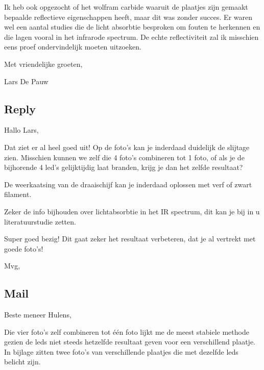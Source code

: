 \documentclass{article}
\begin{document}
 

Ik heb ook opgezocht of het wolfram carbide waaruit de plaatjes zijn gemaakt bepaalde reflectieve eigenschappen heeft, maar dit was zonder succes. Er waren wel een aantal studies die de licht absorbtie besproken om fouten te herkennen en die lagen vooral in het infrarode spectrum. De echte reflectiviteit zal ik misschien eens proef ondervindelijk moeten uitzoeken.

 

Met vriendelijke groeten,

 

Lars De Pauw



\subsection{Reply}

Hallo Lars,



Dat ziet er al heel goed uit!​ Op de foto's kan je inderdaad duidelijk de slijtage zien. Misschien kunnen we zelf die 4 foto's combineren tot 1 foto, of als je de bijhorende 4 led's gelijktijdig laat branden, krijg je dan het zelfde resultaat? 



De weerkaatsing van de draaischijf kan je inderdaad oplossen met verf of zwart filament. 



Zeker de info bijhouden over lichtabsorbtie in het IR spectrum, dit kan je bij in u literatuurstudie zetten.



Super goed bezig! Dit gaat zeker het resultaat verbeteren, dat je al vertrekt met goede foto's!



Mvg,





\subsection{Mail}

Beste meneer Hulens,

 

Die vier foto’s zelf combineren tot één foto lijkt me de meest stabiele methode gezien de leds niet steeds hetzelfde resultaat geven voor een verschillend plaatje. In bijlage zitten twee foto’s van verschillende plaatjes die met dezelfde leds belicht zijn.
\end{document}
